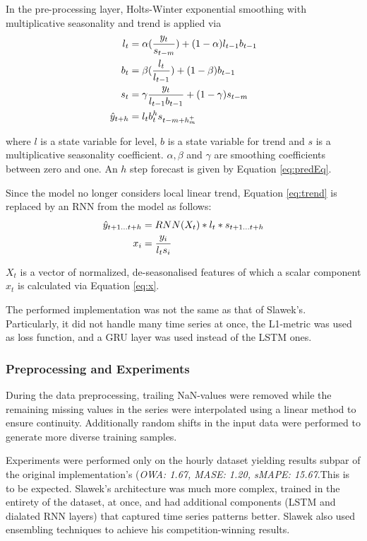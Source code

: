\documentclass[conference]{IEEEtran}
\begin{document}
In the pre-processing layer, Holts-Winter exponential smoothing\cite{winters} with multiplicative seasonality and trend is applied via
\begin{align}
    l_t &= \alpha(\frac{y_t}{s_{t-m}}) + (1 - \alpha)l_{t-1} b_{t-1} \label{eq:level}\\
    b_t &= \beta(\frac{l_t}{l_{t-1}}) + (1- \beta) b_{t-1} \label{eq:trend} \\ 
    s_{t} &= \gamma \frac{y_t}{l_{t-1} b_{t-1}} + (1-\gamma)s_{t-m} \label{eq:season}\\
    \Hat{y}_{t+h} &= l_t  b_t^h s_{t-m+h^+_m} \label{eq:predEq}
\end{align}

where $l$ is a state variable for level, $b$ is a state variable for trend and $s$ is a multiplicative seasonality coefficient. $\alpha, \beta$ and $\gamma$ are smoothing coefficients between zero and one. An $h$ step forecast is given by Equation \ref{eq:predEq}.

Since the model no longer considers local linear trend, Equation \ref{eq:trend} is replaced by an RNN from the model as follows:
\begin{align}
    \Hat{y}_{t+1 \dots t+h} &= RNN(X_t) * l_t * s_{t+1 \dots t+h} \label{eq:modifiedEq}\\
    x_i &= \frac{y_i}{l_t s_i} \label{eq:x}
\end{align}

$X_t$ is a vector of normalized, de-seasonalised features of which a scalar component $x_t$ is calculated via Equation \ref{eq:x}.

The performed implementation was not the same as that of Slawek's\cite{esrnn}. Particularly, it did not handle many time series at once, the L1-metric was used as loss function, and a GRU layer was used instead of the LSTM ones.

\subsubsection{Preprocessing and Experiments}

During the data preprocessing, trailing NaN-values were removed while the remaining missing values in the series were interpolated using a linear method to ensure continuity. Additionally random shifts in the input data were performed to generate more diverse training samples.

Experiments were performed only on the hourly dataset yielding results subpar of the original implementation's (\textit{OWA: 1.67, MASE: 1.20, sMAPE: 15.67}.This is to be expected. Slawek's\cite{esrnn} architecture was much more complex, trained in the entirety of the dataset, at once, and had additional components (LSTM and dialated RNN layers) that captured time series patterns better. Slawek also used ensembling techniques to achieve his competition-winning results.
\end{document}
